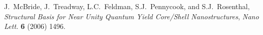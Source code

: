 \documentclass[cits]{JINST}
\begin{document}
\begin{thebibliography}{9}
J.~McBride, J.~Treadway, L.C.~Feldman, S.J.~Pennycook, and S.J.~Rosenthal, \emph{Structural Basis for Near Unity Quantum Yield Core/Shell Nanostructures}, \emph{Nano Lett.} {\bf 6} (2006) 1496.

\end{thebibliography}
\end{document}
